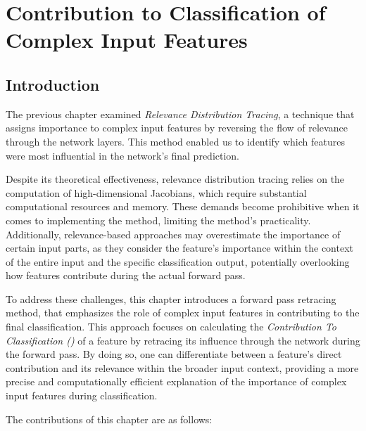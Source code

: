 \chapter{Contribution to Classification of Complex Input Features}
\label{chapter:REVEAL}
\newcommand{\lo}[1][j]{l_{#1}}
\newcommand{\clo}[1][j]{\text{$c$-}\lo[#1]}
\newcommand{\djo}[1][j]{d_{#1}}
\newcommand{\cdjo}[1][j]{\text{$c$-}\djo[#1]}

\section{Introduction}

The previous chapter examined \emph{Relevance Distribution Tracing}, a technique that assigns importance to complex input features by reversing the flow of relevance through the network layers. This method enabled us to identify which features were most influential in the network's final prediction.

Despite its theoretical effectiveness, relevance distribution tracing relies on the computation of high-dimensional Jacobians, which require substantial computational resources and memory. These demands become prohibitive when it comes to implementing the method, limiting the method's practicality. Additionally, relevance-based approaches may overestimate the importance of certain input parts, as they consider the feature's importance within the context of the entire input and the specific classification output, potentially overlooking how features contribute during the actual forward pass.

To address these challenges, this chapter introduces a forward pass retracing method, that emphasizes the role of complex input features in contributing to the final classification. This approach focuses on calculating the \emph{Contribution To Classification (\CTC\/)} of a feature by retracing its influence through the network during the forward pass. By doing so, one can differentiate between a feature's direct contribution and its relevance within the broader input context, providing a more precise and computationally efficient explanation of the importance of complex input features during classification.

The contributions of this chapter are as follows:

